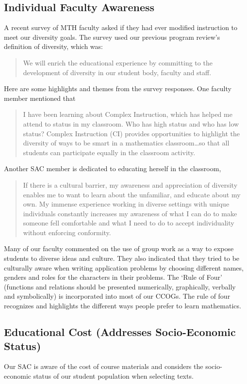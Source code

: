 \subsection{Individual Faculty Awareness}
A recent survey of MTH faculty asked if they had ever modified instruction to meet our diversity goals. The survey used our previous program review's definition of diversity, which was:
\begin{quote}
	We will enrich the educational experience by committing to the development of diversity in our student body, faculty and staff.
\end{quote}
Here are some highlights and themes from the survey responses. One faculty member mentioned that 
\begin{quote}
	I have been learning about Complex Instruction, which has helped me attend to status in my classroom. Who has high status and who has low status? Complex Instruction (CI) provides opportunities to highlight the diversity of ways to be smart in a mathematics classroom\ldots so that all students can participate equally in the classroom activity.
\end{quote}
Another SAC member is dedicated to educating herself in the classroom, 
\begin{quote}
	If there is a cultural barrier, my awareness and appreciation of diversity enables me to want to learn about the unfamiliar, and educate about my own. My immense experience working in diverse settings with unique individuals constantly increases my awareness of what I can do to make someone fell comfortable and what I need to do to accept individuality without enforcing conformity.
\end{quote}
Many of our faculty commented on the use of group work as a way to expose students to diverse ideas and culture.  They also indicated that they tried to be culturally aware when writing application problems by choosing different names, genders and roles for the characters in their problems. The `Rule of Four' (functions and relations should be presented numerically, graphically, verbally and symbolically) is incorporated into most of our CCOGs. The rule of four recognizes and highlights the different ways people prefer to learn mathematics.
\subsection{Educational Cost (Addresses Socio-Economic Status)}
Our SAC is aware of the cost of course materials and considers the socio-economic status of our student population when selecting texts. 

